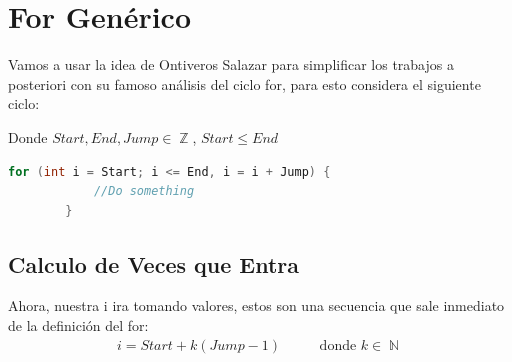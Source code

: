 \documentclass[12pt, fleqn]{article}                            %
\DeclareMathOperator \MegaSpace {\quad \quad}                   %
\theoremstyle{break}                                            %
\DeclareMathOperator \Naturals     {\mathbb{N}}                 %
\DeclareMathOperator \Integers     {\mathbb{Z}}                 %
\begin{document}
\restoregeometry                                                    %
\nopagecolor                                                        %


\tableofcontents{}
\label{sec:Index}

\clearpage




\section{For Genérico}

    Vamos a usar la idea de Ontiveros Salazar para simplificar
    los trabajos a posteriori con su famoso análisis del ciclo for,
    para esto considera el siguiente ciclo:

    Donde $Start, End, Jump \in \Integers$, $Start \leq End$

    \begin{lstlisting}[language=C, gobble=8, basicstyle={\small\color{white}}]
        for (int i = Start; i <= End, i = i + Jump) {
            //Do something
        }
    \end{lstlisting}



    \subsection{Calculo de Veces que Entra}

        Ahora, nuestra i ira tomando valores, estos son una secuencia que 
        sale inmediato de la definición del for:
        \begin{align*}
            i = Start + k(Jump - 1) \MegaSpace \text{donde } k \in \Naturals 
        \end{align*}
\end{document}
